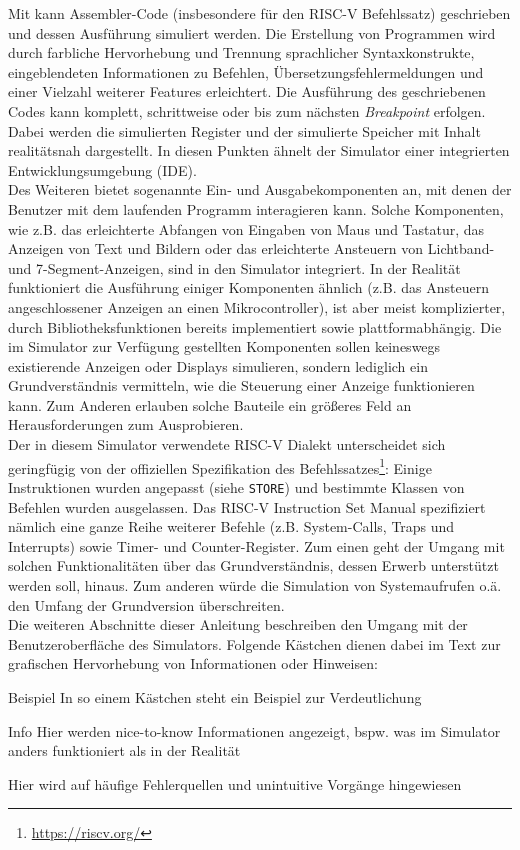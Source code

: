 Mit \erasim kann Assembler-Code (insbesondere für den RISC-V Befehlssatz)
geschrieben und dessen Ausführung simuliert werden. Die Erstellung von
Programmen wird durch farbliche Hervorhebung und Trennung sprachlicher
Syntaxkonstrukte, eingeblendeten Informationen zu Befehlen,
Übersetzungsfehlermeldungen und einer Vielzahl weiterer Features erleichtert.
Die Ausführung des geschriebenen Codes kann komplett, schrittweise oder bis zum
nächsten \emph{Breakpoint} erfolgen. Dabei werden die simulierten Register und
der simulierte Speicher mit Inhalt realitätsnah dargestellt. In diesen Punkten
ähnelt der Simulator einer integrierten Entwicklungsumgebung (IDE).\\
Des Weiteren bietet \erasim sogenannte Ein- und Ausgabekomponenten an, mit denen
der Benutzer mit dem laufenden Programm interagieren kann. Solche Komponenten,
wie z.B. das erleichterte Abfangen von Eingaben von Maus und Tastatur, das Anzeigen
von Text und Bildern oder das erleichterte Ansteuern von Lichtband- und
7-Segment-Anzeigen, sind in den Simulator integriert. In der Realität
funktioniert die Ausführung einiger Komponenten ähnlich (z.B. das Ansteuern
angeschlossener Anzeigen an einen Mikrocontroller), ist aber meist
komplizierter, durch Bibliotheksfunktionen bereits implementiert sowie
plattformabhängig. Die im Simulator zur Verfügung gestellten Komponenten sollen
keineswegs existierende Anzeigen oder Displays simulieren, sondern lediglich ein
Grundverständnis vermitteln, wie die Steuerung einer Anzeige funktionieren kann.
Zum Anderen erlauben solche Bauteile ein größeres Feld an Herausforderungen zum
Ausprobieren.\\ Der in diesem Simulator verwendete RISC-V Dialekt unterscheidet
sich geringfügig von der offiziellen Spezifikation des
Befehlssatzes\footnote{\url{https://riscv.org/}}: Einige Instruktionen wurden
angepasst (siehe \texttt{STORE}) und bestimmte Klassen von Befehlen wurden
ausgelassen. Das RISC-V Instruction Set Manual spezifiziert nämlich eine ganze
Reihe weiterer Befehle (z.B. System-Calls, Traps und Interrupts) sowie Timer-
und Counter-Register. Zum einen geht der Umgang mit solchen Funktionalitäten
über das Grundverständnis, dessen Erwerb unterstützt werden soll, hinaus. Zum
anderen würde die Simulation von Systemaufrufen o.ä. den Umfang der Grundversion
überschreiten.\\

Die weiteren Abschnitte dieser Anleitung beschreiben den Umgang mit der
Benutzeroberfläche des Simulators. Folgende Kästchen dienen dabei im Text zur
grafischen Hervorhebung von Informationen oder Hinweisen:
\begin{exampleblock}{Beispiel}
	In so einem Kästchen steht ein Beispiel zur Verdeutlichung
\end{exampleblock}

\begin{infoblock}{Info}
	Hier werden nice-to-know Informationen angezeigt, bspw. was im Simulator anders funktioniert als in der Realität
\end{infoblock}

\begin{warningblock}
	Hier wird auf häufige Fehlerquellen und unintuitive Vorgänge hingewiesen
\end{warningblock}